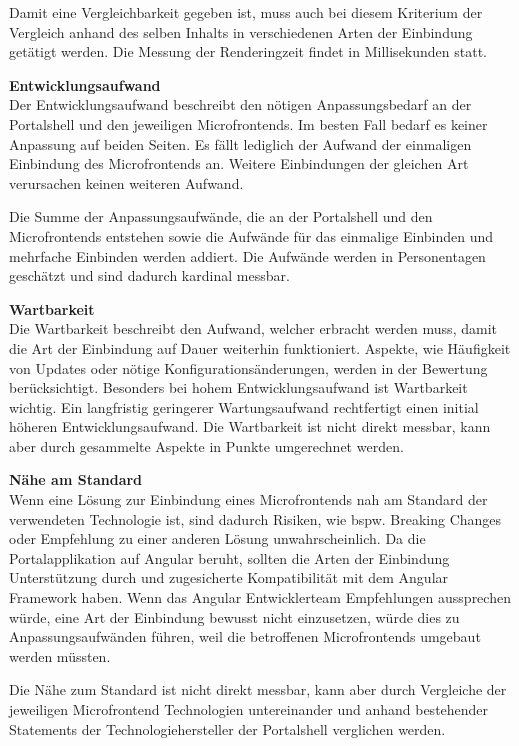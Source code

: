 Damit eine Vergleichbarkeit gegeben ist, muss auch bei diesem Kriterium der Vergleich anhand des selben Inhalts in verschiedenen Arten der Einbindung getätigt werden. Die Messung der Renderingzeit findet in Millisekunden statt.

\textbf{Entwicklungsaufwand}\\
Der Entwicklungsaufwand beschreibt den nötigen Anpassungsbedarf an der Portalshell und den jeweiligen Microfrontends. Im besten Fall bedarf es keiner Anpassung auf beiden Seiten. Es fällt lediglich der Aufwand der einmaligen Einbindung des Microfrontends an. Weitere Einbindungen der gleichen Art verursachen keinen weiteren Aufwand.

Die Summe der Anpassungsaufwände, die an der Portalshell und den Microfrontends entstehen sowie die Aufwände für das einmalige Einbinden und mehrfache Einbinden werden addiert. Die Aufwände werden in Personentagen geschätzt und sind dadurch kardinal messbar.

\textbf{Wartbarkeit}\\
Die Wartbarkeit beschreibt den Aufwand, welcher erbracht werden muss, damit die Art der Einbindung auf Dauer weiterhin funktioniert. Aspekte, wie Häufigkeit von Updates oder nötige Konfigurationsänderungen, werden in der Bewertung berücksichtigt. Besonders bei hohem Entwicklungsaufwand ist Wartbarkeit wichtig. Ein langfristig geringerer Wartungsaufwand rechtfertigt einen initial höheren Entwicklungsaufwand. Die Wartbarkeit ist nicht direkt messbar, kann aber durch gesammelte Aspekte in Punkte umgerechnet werden.

\textbf{Nähe am Standard}\\
Wenn eine Lösung zur Einbindung eines Microfrontends nah am Standard der verwendeten Technologie ist, sind dadurch Risiken, wie bspw. Breaking Changes oder Empfehlung zu einer anderen Lösung unwahrscheinlich. Da die Portalapplikation auf Angular beruht, sollten die Arten der Einbindung Unterstützung durch und zugesicherte Kompatibilität mit dem Angular Framework haben. Wenn das Angular Entwicklerteam Empfehlungen aussprechen würde, eine Art der Einbindung bewusst nicht einzusetzen, würde dies zu Anpassungsaufwänden führen, weil die betroffenen Microfrontends umgebaut werden müssten.

Die Nähe zum Standard ist nicht direkt messbar, kann aber durch Vergleiche der jeweiligen Microfrontend Technologien untereinander und anhand bestehender Statements der Technologiehersteller der Portalshell verglichen werden. 

